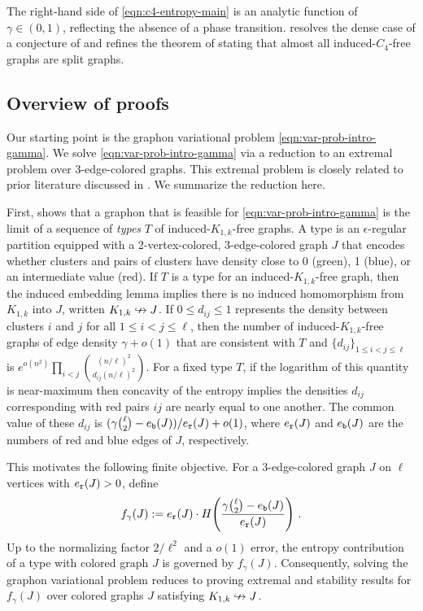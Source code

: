 The right-hand side of \eqref{eqn:c4-entropy-main} is an analytic function of $\gamma\in(0,1)$, reflecting the absence of a phase transition.  resolves the dense case of a conjecture of \citeauthor{morris2024asymmetric} \cite[Conjecture~6.1]{morris2024asymmetric} and refines the theorem of \citeauthor{promel1991excluding} \cite{promel1991excluding} stating that almost all induced-$C_4$-free graphs are split graphs.

\subsection{Overview of proofs}\label{subsec:overview}
Our starting point is the graphon variational problem \eqref{eqn:var-prob-intro-gamma}. We solve \eqref{eqn:var-prob-intro-gamma} via a reduction to an extremal problem over 3-edge-colored graphs. This extremal problem is closely related to prior literature discussed in . We summarize the reduction here.

First,  shows that a graphon that is feasible for \eqref{eqn:var-prob-intro-gamma} is the limit of a sequence of \emph{types} $T$ of induced-$K_{1,k}$-free graphs. A type is an $\epsilon$-regular partition equipped with a 2-vertex-colored, 3-edge-colored graph $J$ that encodes whether clusters and pairs of clusters have density close to 0 (green), 1 (blue), or an intermediate value (red). If $T$ is a type for an induced-$K_{1,k}$-free graph, then the induced embedding lemma implies there is no induced homomorphism from $K_{1,k}$ into $J$, written $K_{1,k}\nHookrightarrow J$. If $0\leq d_{ij}\leq1$ represents the density between clusters $i$ and $j$ for all $1\leq i<j\leq\ell$, then the number of induced-$K_{1,k}$-free graphs of edge density $\gamma+o(1)$ that are consistent with $T$ and $\{d_{ij}\}_{1\leq i<j\leq\ell}$ is $e^{o(n^2)}\prod_{i<j}\binom{(n/\ell)^2}{d_{ij}(n/\ell)^2}$. For a fixed type $T$, if the logarithm of this quantity is near-maximum then concavity of the entropy implies the densities $d_{ij}$ corresponding with red pairs $ij$ are nearly equal to one another. The common value of these $d_{ij}$ is $(\gamma\binom{\ell}{2}-e_{\normalfont\texttt b}(J))/e_{\normalfont\texttt r}(J)+o(1)$, where $e_{\normalfont\texttt r}(J)$ and $e_{\normalfont\texttt b}(J)$ are the numbers of red and blue edges of $J$, respectively.

This motivates the following finite objective. For a 3-edge-colored graph $J$ on $\ell$ vertices with $e_{\normalfont\texttt r}(J)>0$, define
\begin{equation}\label{eqn:overview-fgamma}
f_\gamma(J):=e_{\normalfont\texttt r}(J)\cdot H\!\left(\frac{\gamma\binom{\ell}{2}-e_{\normalfont\texttt b}(J)}{e_{\normalfont\texttt r}(J)}\right)\,.
\end{equation}
Up to the normalizing factor $2/\ell^2$ and a $o(1)$ error, the entropy contribution of a type with colored graph $J$ is governed by $f_\gamma(J)$. Consequently, solving the graphon variational problem reduces to proving extremal and stability results for $f_\gamma(J)$ over colored graphs $J$ satisfying $K_{1,k}\nHookrightarrow J$.

